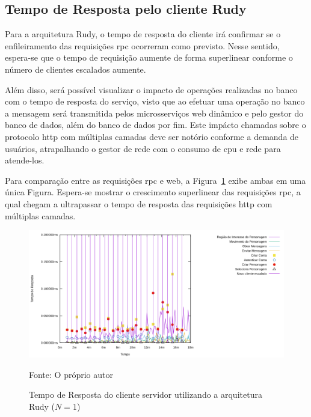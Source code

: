 \subsection{Tempo de Resposta pelo cliente Rudy}

Para a arquitetura Rudy, o tempo de resposta do cliente irá confirmar se o enfileiramento das requisições \ac{rpc} ocorreram como previsto.
%
Nesse sentido, espera-se que o tempo de requisição aumente de forma superlinear conforme o número de clientes escalados aumente.


Além disso, será possível visualizar o impacto de operações realizadas no banco com o tempo de resposta do serviço, visto que ao efetuar uma operação no banco a mensagem será transmitida pelos microsserviços web dinâmico e pelo gestor do banco de dados, além do banco de dados por fim.
%
Este impácto chamadas sobre o protocolo \ac{http} com múltiplas camadas deve ser notório conforme a demanda de usuários, atrapalhando o gestor de rede com o consumo de \ac{cpu} e rede para atende-los.

Para comparação entre as requisições \ac{rpc} e web, a Figura~\ref{fig:rudy_t4_reqs} exibe ambas em uma única Figura.
%
Espera-se mostrar o crescimento superlinear das requisições \ac{rpc}, a qual chegam a ultrapassar o tempo de resposta das requisições \ac{http} com múltiplas camadas.

\begin{figure}[htb!]
    \caption{Tempo de Resposta do cliente servidor utilizando a arquitetura Rudy ($N=1$)}
    \label{fig:rudy_t4_reqs}
    \includegraphics[width=\textwidth]{metricas_rudy_t4/rudyc.png}
    \centering
    
    Fonte: O próprio autor
\end{figure}

